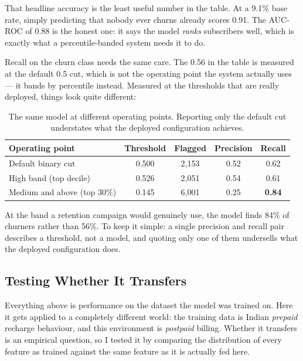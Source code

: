 That headline accuracy is the least useful number in the table. At a 9.1\% base
rate, simply predicting that nobody ever churns already scores 0.91. The
AUC-ROC of 0.88 is the honest one: it says the model \emph{ranks} subscribers
well, which is exactly what a percentile-banded system needs it to do.

Recall on the churn class needs the same care. The 0.56 in the table is measured
at the default 0.5 cut, which is not the operating point the system actually
uses --- it bands by percentile instead. Measured at the thresholds that are
really deployed, things look quite different:

\begin{table}[H]
\centering
\begin{tabular}{lcccc}
\toprule
\textbf{Operating point} & \textbf{Threshold} & \textbf{Flagged} & \textbf{Precision} & \textbf{Recall} \\
\midrule
Default binary cut          & 0.500 & 2{,}153 & 0.52 & 0.62 \\
High band (top decile)      & 0.526 & 2{,}051 & 0.54 & 0.61 \\
Medium and above (top 30\%) & 0.145 & 6{,}001 & 0.25 & \textbf{0.84} \\
\bottomrule
\end{tabular}
\caption{The same model at different operating points. Reporting only the default
cut understates what the deployed configuration achieves.}
\label{tab:churn-thresholds}
\end{table}

At the band a retention campaign would genuinely use, the model finds 84\% of
churners rather than 56\%. To keep it simple: a single precision and recall pair
describes a threshold, not a model, and quoting only one of them undersells what
the deployed configuration does.

\subsection{Testing Whether It Transfers}

Everything above is performance on the dataset the model was trained on. Here it
gets applied to a completely different world: the training data is Indian
\emph{prepaid} recharge behaviour, and this environment is \emph{postpaid}
billing. Whether it transfers is an empirical question, so I tested it by
comparing the distribution of every feature as trained against the same feature
as it is actually fed here.

